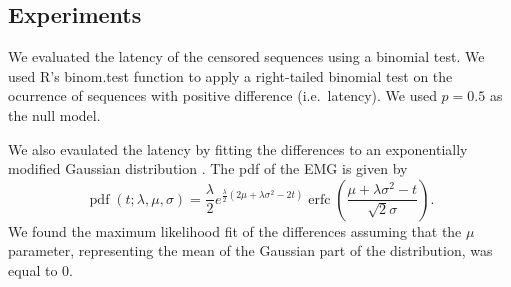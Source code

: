 \documentclass[12pt]{article}
\begin{document}
\subsection * {Experiments} \label{subsec:experiments}

%
%
%


We evaluated the latency of the censored sequences using a {binomial test}.
We used R's binom.test function to apply a right-tailed binomial test on the ocurrence of sequences with positive difference (i.e.~latency). We used $p=0.5$ as the null model.

We also evaulated the latency by fitting the differences to an exponentially modified Gaussian distribution \citep[EMG;][]{Golubev10}. The pdf of the EMG is given by
\[\operatorname{pdf}(t; \lambda, \mu, \sigma) = \frac{\lambda}{2}e^{\frac{\lambda}{2}(2\mu+\lambda\sigma^2-2t)}\operatorname{erfc}\left(\frac{\mu + \lambda\sigma^2-t}{\sqrt{2}\sigma}\right).\]
We found the maximum likelihood fit of the differences assuming that the $\mu$ parameter, representing the mean of the Gaussian part of the distribution, was equal to 0.
\end{document}
